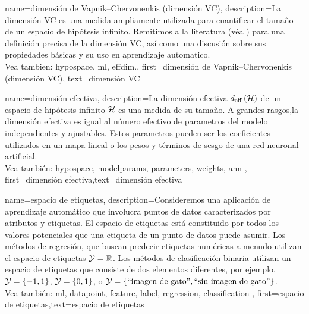 {name={dimensión de Vapnik–Chervonenkis (dimensión VC)},
description={La dimensión VC 
	es una medida ampliamente utilizada para cuantificar el tamaño de un espacio de hipótesis infinito. 
	Remitimos a la literatura (véa \cite{ShalevMLBook}) para una definición precisa 
	de la dimensión VC, así como una discusión sobre sus propiedades básicas y su uso en aprendizaje automatico.
			\\ 
	Vea tambien: \gls{hypospace}, \gls{ml}, \gls{effdim}.},
first={dimensión de Vapnik–Chervonenkis (dimensión VC)},
text={dimensión VC}  
}


{name={dimensión efectiva},
	description={La dimensión efectiva $d_{\rm eff} \left( \mathcal{H} \right)$ de un 
		espacio de hipótesis infinito $\mathcal{H}$ es una medida de su tamaño. A grandes rasgos,la 
		dimensión efectiva es igual al número efectivo de parametros del modelo independientes y ajustables. 
		Estos parametros pueden ser los coeficientes utilizados en un mapa lineal o los 
		pesos y términos de sesgo de una red neuronal artificial.
		\\
		Vea también: \gls{hypospace}, \glspl{modelparam}, \gls{parameters}, \gls{weights}, \gls{ann} },
	first={dimensión efectiva},text={dimensión efectiva}  
}

{name={espacio de etiquetas},
	description={Consideremos una aplicación de aprendizaje automático que involucra puntos de datos caracterizados por atributos
		y etiquetas. El espacio de etiquetas está constituido por todos los valores potenciales que una etiqueta
		de un punto de datos puede asumir. Los métodos de regresión, que buscan predecir etiquetas numéricas 
		a menudo utilizan el espacio de etiquetas $\mathcal{Y} = \mathbb{R}$. Los métodos de clasificación binaria utilizan un espacio de etiquetas  
		que consiste de dos elementos diferentes, por ejemplo, $\mathcal{Y} =\{-1,1\}$, $\mathcal{Y}=\{0,1\}$, 
		o $\mathcal{Y} = \{ \mbox{``imagen de gato''}, \mbox{``sin imagen de gato''} \}$.
		\\
		Vea también: \gls{ml}, \gls{datapoint},  \gls{feature}, \gls{label}, \Gls{regression}, \gls{classification} }, 
		first={espacio de etiquetas},text={espacio de etiquetas}  
}

